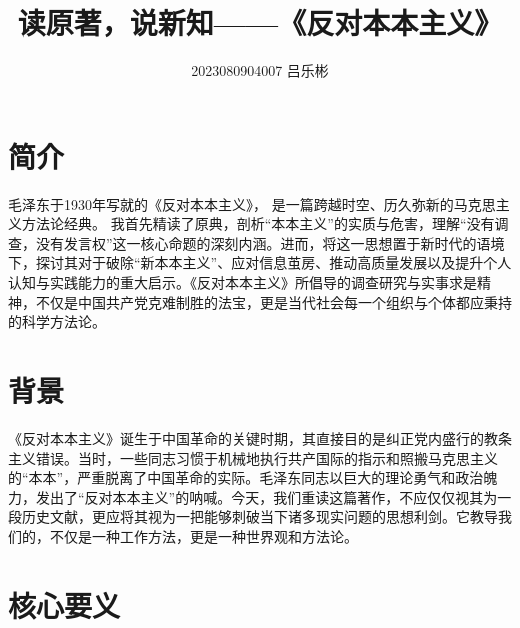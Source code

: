 \documentclass[a4paper,12pt]{article}
\title{读原著，说新知——《反对本本主义》}
\author{2023080904007 吕乐彬}
\begin{document}
 
\maketitle
 
\section{简介}
毛泽东于1930年写就的《反对本本主义》，
是一篇跨越时空、历久弥新的马克思主义方法论经典。
我首先精读了原典，剖析“本本主义”的实质与危害，理解“没有调查，没有发言权”这一核心命题的深刻内涵。进而，将这一思想置于新时代的语境下，探讨其对于破除“新本本主义”、应对信息茧房、推动高质量发展以及提升个人认知与实践能力的重大启示。《反对本本主义》所倡导的调查研究与实事求是精神，不仅是中国共产党克难制胜的法宝，更是当代社会每一个组织与个体都应秉持的科学方法论。

 
\section{背景}

《反对本本主义》诞生于中国革命的关键时期，其直接目的是纠正党内盛行的教条主义错误。当时，一些同志习惯于机械地执行共产国际的指示和照搬马克思主义的“本本”，严重脱离了中国革命的实际。毛泽东同志以巨大的理论勇气和政治魄力，发出了“反对本本主义”的呐喊。今天，我们重读这篇著作，不应仅仅视其为一段历史文献，更应将其视为一把能够刺破当下诸多现实问题的思想利剑。它教导我们的，不仅是一种工作方法，更是一种世界观和方法论。

\section{核心要义}
\end{document}
